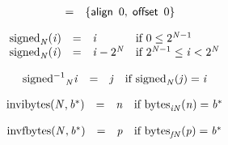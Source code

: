 \vspace{1ex}

$$
\begin{array}{@{}lcl@{}l@{}}
 &=& \{ \begin{array}[t]{@{}l@{}}
\mathsf{align}~\,0,\; \mathsf{offset}~\,0 \}\end{array} &  \\
\end{array}
$$

\vspace{1ex}

$$
\begin{array}{@{}lcl@{}l@{}}
{{\mathrm{signed}}}_{{\mathit{N}}}({\mathit{i}}) &=& {\mathit{i}} &\quad
  \mbox{if}~0 \leq {2^{{\mathit{N}} - 1}} \\
{{\mathrm{signed}}}_{{\mathit{N}}}({\mathit{i}}) &=& {\mathit{i}} - {2^{{\mathit{N}}}} &\quad
  \mbox{if}~{2^{{\mathit{N}} - 1}} \leq {\mathit{i}} < {2^{{\mathit{N}}}} \\
\end{array}
$$

$$
\begin{array}{@{}lcl@{}l@{}}
{{{{{\mathrm{signed}}^{{-1}}}}{}}_{{\mathit{N}}}}{{{\mathit{i}}}} &=& {\mathit{j}} &\quad
  \mbox{if}~{{\mathrm{signed}}}_{{\mathit{N}}}({\mathit{j}}) = {{\mathit{i}}} \\
\end{array}
$$

\vspace{1ex}

$$
\begin{array}{@{}lcl@{}l@{}}
{\mathrm{invibytes}}({\mathit{N}}, {{\mathit{b}}^\ast}) &=& {\mathit{n}} &\quad
  \mbox{if}~{{\mathrm{bytes}}}_{{{\mathit{i}}}{{\mathit{N}}}}({\mathit{n}}) = {{\mathit{b}}^\ast} \\
\end{array}
$$

$$
\begin{array}{@{}lcl@{}l@{}}
{\mathrm{invfbytes}}({\mathit{N}}, {{\mathit{b}}^\ast}) &=& {\mathit{p}} &\quad
  \mbox{if}~{{\mathrm{bytes}}}_{{{\mathit{f}}}{{\mathit{N}}}}({\mathit{p}}) = {{\mathit{b}}^\ast} \\
\end{array}
$$

\vspace{1ex}

